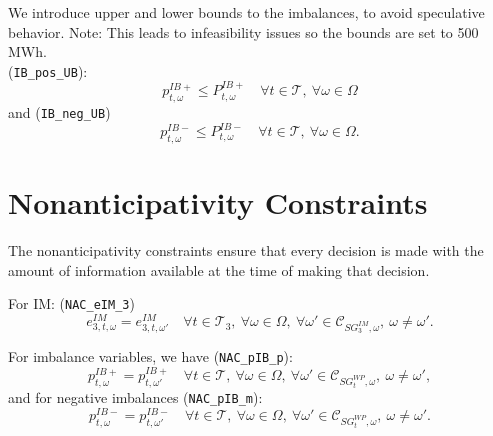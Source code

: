 \documentclass{article}
\begin{document}
We introduce upper and lower bounds to the imbalances, to avoid speculative behavior.
Note: This leads to infeasibility issues so the bounds are set to 500 MWh.\\

(\verb|IB_pos_UB|):\\
\begin{equation} \label{EQ:VPP_IB_MAX}
	p_{t, \omega}^{IB+} \leq P_{t, \omega}^{IB+} \quad \forall t \in \mathcal{T}, \ \forall \omega \in \Omega
\end{equation}
and (\verb|IB_neg_UB|)
\begin{equation} \label{EQ:VPP_IB_MIN}
	p_{t, \omega}^{IB-} \leq P_{t, \omega}^{IB-} \quad \forall t \in \mathcal{T}, \ \forall \omega \in \Omega.
\end{equation}




\section{Nonanticipativity Constraints}
\label{SEC:NonanticipativityConstraints}

The nonanticipativity constraints ensure that every decision is made with the amount of information available at the time of making that decision.

For IM: (\verb|NAC_eIM_3|)
  \begin{equation} \label{EQ:NAC_eIM3}
  	e^{IM}_{3, t, \omega} = e^{IM}_{3, t, \omega'} \quad 
  	\forall t \in \mathcal{T}_3, \ 
  	\forall \omega \in \Omega, \ 
  	\forall \omega' \in \mathcal{C}_{SG^{IM}_3, \omega}, \ \omega \neq \omega'.
  \end{equation}



For imbalance variables, we have (\verb|NAC_pIB_p|):
\begin{equation} \label{EQ:NAC_pPIB}
	p^{IB+}_{t, \omega} = p^{IB+}_{t, \omega'} \quad \forall t \in \mathcal{T}, \ \forall \omega \in \Omega, \ \forall \omega' \in \mathcal{C}_{SG^{WP}_t, \omega}, \ \omega \neq \omega',
\end{equation}
and for negative imbalances (\verb|NAC_pIB_m|):
\begin{equation} \label{EQ:NAC_pNIB}
	p^{IB-}_{t, \omega} = p^{IB-}_{t, \omega'} \quad \forall t \in \mathcal{T}, \ \forall \omega \in \Omega, \ \forall \omega' \in \mathcal{C}_{SG^{WP}_t, \omega}, \ \omega \neq \omega'.
\end{equation}
\end{document}
